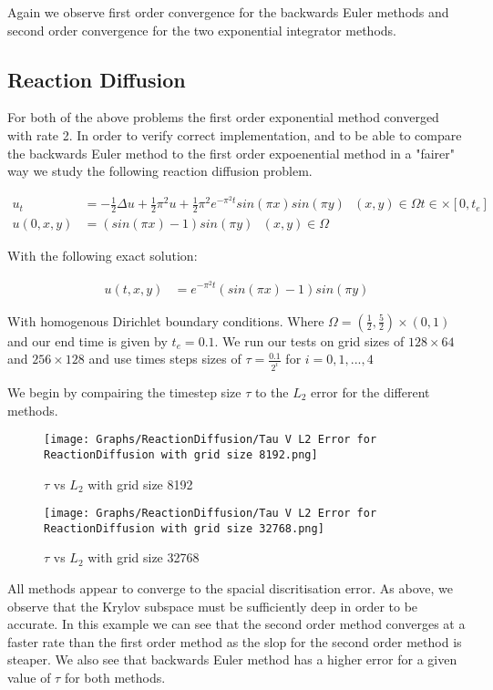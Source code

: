 Again we observe first order convergence for the backwards Euler methods and second order convergence for the two exponential integrator methods.

\subsection{Reaction Diffusion}

For both of the above problems the first order exponential method converged with rate 2.
In order to verify correct implementation, and to be able to compare the backwards Euler method to the first order expoenential method in a "fairer" way we study the following reaction diffusion problem\cite{Huang2022}.

\begin{align*}
    u_t &= -\frac12\Delta u + \frac12 \pi^2u + \frac12 \pi^2 e^{-\pi^2t}sin(\pi x)sin(\pi y) \text{ } (x,y)\in\Omega t\in\times[0,t_e]\\
    u(0,x,y) &= (sin(\pi x) - 1)sin(\pi y) \text{ } (x,y)\in \Omega
\end{align*}

With the following exact solution:

\begin{align*}
    u(t, x, y) &= e^{-\pi^2t}(sin(\pi x) - 1)sin(\pi y)
\end{align*}

With homogenous Dirichlet boundary conditions.
Where $\Omega = (\frac12, \frac52)\times(0,1)$ and our end time is given by $t_e = 0.1$.
We run our tests on grid sizes of $128\times64$ and $256\times128$ and use times steps sizes of $\tau=\frac{0.1}{2^i}$ for $i = 0,1,...,4$


We begin by compairing the timestep size $\tau$ to the $L_2$ error for the different methods.
\begin{figure}[H]
    \centering
    \begin{minipage}{0.49\textwidth}
        \texttt{[image: Graphs/ReactionDiffusion/Tau V L2 Error for ReactionDiffusion with grid size 8192.png]} %
        \caption{$\tau$ vs $L_2$ with grid size 8192}
        \label{fig:ACtauE}
    \end{minipage}\hfill
    \centering
    \begin{minipage}{0.49\textwidth}
        \texttt{[image: Graphs/ReactionDiffusion/Tau V L2 Error for ReactionDiffusion with grid size 32768.png]} %
        \caption{$\tau$ vs $L_2$ with grid size 32768}
        \label{fig:ACtauE1024}
    \end{minipage}\hfill
\end{figure}
All methods appear to converge to the spacial discritisation error.
As above, we observe that the Krylov subspace must be sufficiently deep in order to be accurate.
In this example we can see that the second order method converges at a faster rate than the first order method as the slop for the second order method is steaper.
We also see that backwards Euler method has a higher error for a given value of $\tau$ for both methods.

